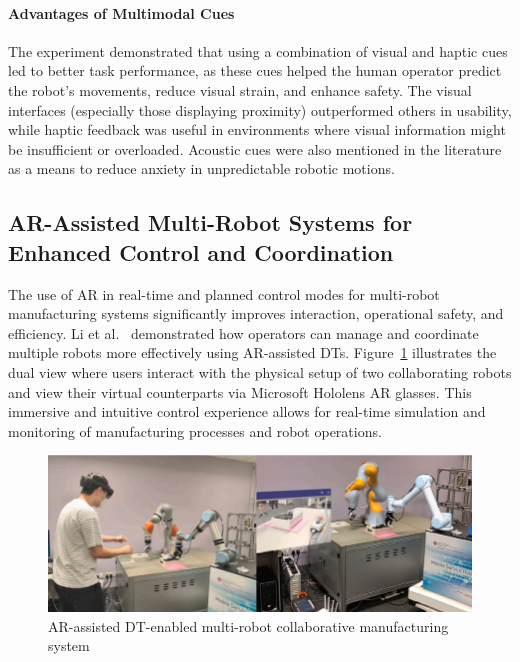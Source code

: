     \paragraph{\textbf{Advantages of Multimodal Cues}}
    The experiment demonstrated that using a combination of visual and haptic cues led to better task performance, as these cues helped the human operator predict the robot's movements, reduce visual strain, and enhance safety. The visual interfaces (especially those displaying proximity) outperformed others in usability, while haptic feedback was useful in environments where visual information might be insufficient or overloaded. Acoustic cues were also mentioned in the literature as a means to reduce anxiety in unpredictable robotic motions.

% 
\subsection{AR-Assisted Multi-Robot Systems for Enhanced Control and Coordination}

    
    The use of \ac{AR} in real-time and planned control modes for multi-robot manufacturing systems significantly improves interaction, operational 
    safety, and efficiency. Li et al.~\cite{LI2022102321} demonstrated how operators can manage and coordinate multiple robots more effectively using 
    \ac{AR}-assisted DTs. Figure~\ref{fig:physical-digital} illustrates the dual view where users interact with the physical setup of two collaborating 
    robots and view their virtual counterparts via Microsoft Hololens \ac{AR} glasses. This immersive and intuitive control experience allows for 
    real-time simulation and monitoring of manufacturing processes and robot operations.
    
    \begin{figure}[!htpb]
        \centering
        \includegraphics[width=0.85\linewidth]{figs/physical-digital.png}
        \caption{\ac{AR}-assisted \ac{DT}-enabled multi-robot collaborative manufacturing system \cite{LI2022102321}}
        \label{fig:physical-digital}
    \end{figure}

